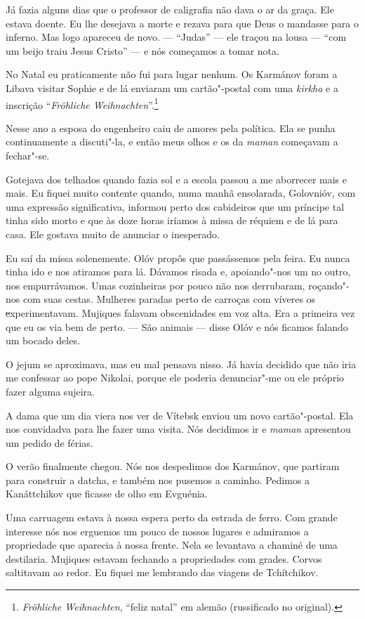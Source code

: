 Já fazia alguns dias que o professor de caligrafia não dava o ar da
graça. Ele estava doente. Eu lhe desejava a morte e rezava para que Deus
o mandasse para o inferno. Mas logo apareceu de novo. --- ``Judas'' ---
ele traçou na lousa --- ``com um beijo traiu Jesus Cristo'' --- e nós
começamos a tomar nota.

No Natal eu praticamente não fui para lugar nenhum. Os Karmánov foram a
Libava visitar Sophie e de lá enviaram um cartão"-postal com uma
\emph{kirkha} e a inscrição ``\emph{Fröhliche Weihnachten}''.\footnote{\emph{Fröhliche
  Weihnachten}, ``feliz natal'' em alemão (russificado no original).}

Nesse ano a esposa do engenheiro caiu de amores pela política. Ela se
punha continuamente a discuti"-la, e então meus olhos e os da
\emph{maman} começavam a fechar"-se.

Gotejava dos telhados quando fazia sol e a escola passou a me aborrecer
mais e mais. Eu fiquei muito contente quando, numa manhã ensolarada,
Golovnióv, com uma expressão significativa, informou perto dos
cabideiros que um príncipe tal tinha sido morto e que às doze horas
iríamos à missa de réquiem e de lá para casa. Ele gostava muito de
anunciar o inesperado.

Eu saí da missa solenemente. Olóv propôs que passássemos pela feira. Eu
nunca tinha ido e nos atiramos para lá. Dávamos risada e, apoiando"-nos
um no outro, nos empurrávamos. Umas cozinheiras por pouco não nos
derrubaram, roçando"-nos com suas cestas. Mulheres paradas perto de
carroças com víveres os \sout{e}xperimentavam. Mujiques falavam
obscenidades em voz alta. Era a primeira vez que eu os via bem de perto.
--- São animais --- disse Olóv e nós ficamos falando um bocado deles.

O jejum se aproximava, mas eu mal pensava nisso. Já havia decidido que
não iria me confessar ao pope Nikolai, porque ele poderia denunciar"-me
ou ele próprio fazer alguma sujeira.

A dama que um dia viera nos ver de Vítebsk enviou um novo cartão"-postal.
Ela nos convidadva para lhe fazer uma visita. Nós decidimos ir e
\emph{maman} apresentou um pedido de férias.

O verão finalmente chegou. Nós nos despedimos dos Karmánov, que partiram
para construir a datcha, e também nos pusemos a caminho. Pedimos a
Kanáttchikov que ficasse de olho em Evguénia.

Uma carruagem estava à nossa espera perto da estrada de ferro. Com
grande interesse nós nos erguemos um pouco de nossos lugares e admiramos
a propriedade que aparecia à nossa frente. Nela se levantava a chaminé
de uma destilaria. Mujiques estavam fechando a propriedades com grades.
Corvos saltitavam ao redor. Eu fiquei me lembrando das viagens de
Tchítchikov.

